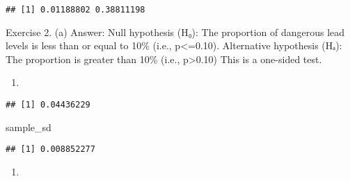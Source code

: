 \documentclass[
]{article}
\newenvironment{Shaded}{\begin{snugshade}}{\end{snugshade}}
\newcommand{\AttributeTok}[1]{\textcolor[rgb]{0.13,0.29,0.53}{#1}}
\newcommand{\ConstantTok}[1]{\textcolor[rgb]{0.56,0.35,0.01}{#1}}
\newcommand{\DecValTok}[1]{\textcolor[rgb]{0.00,0.00,0.81}{#1}}
\newcommand{\FloatTok}[1]{\textcolor[rgb]{0.00,0.00,0.81}{#1}}
\newcommand{\FunctionTok}[1]{\textcolor[rgb]{0.13,0.29,0.53}{\textbf{#1}}}
\newcommand{\NormalTok}[1]{#1}
\newcommand{\OtherTok}[1]{\textcolor[rgb]{0.56,0.35,0.01}{#1}}
\newcommand{\SpecialCharTok}[1]{\textcolor[rgb]{0.81,0.36,0.00}{\textbf{#1}}}
\newcommand{\StringTok}[1]{\textcolor[rgb]{0.31,0.60,0.02}{#1}}
\providecommand{\tightlist}{%
  \setlength{\itemsep}{0pt}\setlength{\parskip}{0pt}}
\begin{document}
\begin{verbatim}
## [1] 0.01188802 0.38811198
\end{verbatim}

Exercise 2. (a) Answer: Null hypothesis (H₀): The proportion of
dangerous lead levels is less than or equal to 10\% (i.e.,
p\textless=0.10). Alternative hypothesis (Hₐ): The proportion is greater
than 10\% (i.e., p\textgreater0.10) This is a one-sided test.

\begin{enumerate}
\def\labelenumi{(\alph{enumi})}
\setcounter{enumi}{1}
\tightlist
\item
\end{enumerate}

\begin{Shaded}
\end{Shaded}

\begin{verbatim}
## [1] 0.04436229
\end{verbatim}

\begin{Shaded}
\begin{Highlighting}[]
\NormalTok{sample\_sd}
\end{Highlighting}
\end{Shaded}

\begin{verbatim}
## [1] 0.008852277
\end{verbatim}

\begin{enumerate}
\def\labelenumi{(\alph{enumi})}
\setcounter{enumi}{2}
\tightlist
\item
\end{enumerate}
\end{document}
